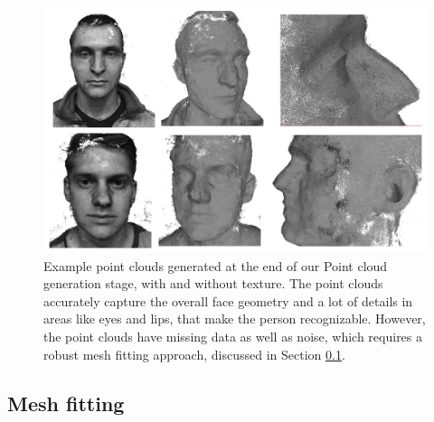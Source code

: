 \documentclass[10pt,twocolumn,letterpaper]{article}
\begin{document}
\begin{figure}[t]
\begin{center}
   \includegraphics[width=0.95\linewidth]{images/point_clouds_sample.png}
\end{center}
\vspace{-1cm}
   \caption{Example point clouds generated at the end of our Point cloud generation stage, with and without texture. The point clouds accurately capture the overall face geometry and a lot of details in areas like eyes and lips, that make the person recognizable. However, the point clouds have missing data as well as noise, which requires a robust mesh fitting approach, discussed in Section \ref{sec:mesh_fit}.  }
\label{fig:pcl_sample}
\end{figure}

\subsection{Mesh fitting} \label{sec:mesh_fit}
\end{document}
